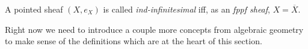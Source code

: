 \begin{defn}
	A pointed sheaf $\left(X, e_X\right)$ is called \emph{ind-infinitesimal} iff,
	as an \emph{fppf sheaf}, $X = \overline{X}$.
\end{defn}


\noindent
Right now we need to introduce a couple more concepts from algebraic
geometry to make sense of the definitions which are at the heart of this section.
%



